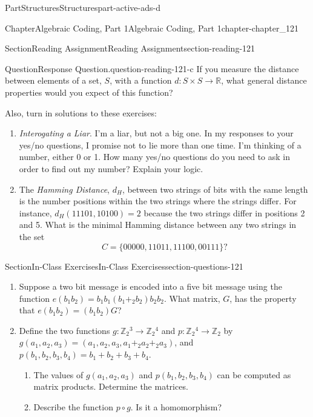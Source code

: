 \documentclass[oneside,10pt,]{book}
\numberwithin{equation}{section}
\begin{document}
\begin{partptx}{Part}{Structures}{}{Structures}{}{}{part-active-ads-d}
\begin{chapterptx}{Chapter}{Algebraic Coding, Part 1}{}{Algebraic Coding, Part 1}{}{}{chapter-chapter_121}
\begin{sectionptx}{Section}{Reading Assignment}{}{Reading Assignment}{}{}{section-reading-121}
\begin{question}{Question}{Response Question.}{question-reading-121-c}
If you measure the distance between elements of a set, \(S\), with a function \(d: S\times S \rightarrow \mathbb{R}\), what general distance properties would you expect of this function?%
\end{question}
Also, turn in solutions to these exercises:%
\begin{enumerate}[label=\arabic*.]
\item{}\emph{Interogating a Liar}.  I'm a liar, but not a big one.  In my responses to your yes\slash{}no questions, I promise not to lie more than one time.  I'm thinking of a number, either 0 or 1.  How many yes\slash{}no questions do you need to ask in order to find out my number? Explain your logic.%
\item{}The \emph{Hamming Distance}, \(d_H\), between two strings of bits with the same length is the number positions within the two strings where the strings differ.  For instance, \(d_H(11101,10100)=2\) because the two strings differ in positions 2 and 5.  What is the minimal Hamming distance between any two strings in the set%
\begin{equation*}
C =\{00000,11011,11100,00111\}?
\end{equation*}
%
\end{enumerate}
%
\end{sectionptx}
%
%
\typeout{************************************************}
\typeout{************************************************}
%
\begin{sectionptx}{Section}{In-Class Exercises}{}{In-Class Exercises}{}{}{section-questions-121}
%
\begin{enumerate}[label=\arabic*.]
\item{}Suppose a two bit message is encoded into a five bit message using the function \(e(b_{1}b_{2})=b_{1}b_{1}(b_{1}+_2 b_{2})b_{2}b_{2}\).  What matrix, \(G\), has the property that \(e(b_{1}b_{2})=(b_{1} b_{2}) G\)?%
\item{}Define the two functions  \(g:\mathbb{Z}_2{}^3\rightarrow  \mathbb{Z}_2{}^4\)  and \(p:\mathbb{Z}_2{}^4\to \mathbb{Z}_2\) by \(g(a_1,a_2,a_3) = (a_1,a_2,a_3 ,a_1+_2 a_2+_2a_3)\), and \(p(b_1,b_2,b_3,b_4)=b_1+b_2+b_3+b_4\).%
\begin{enumerate}[label=(\alph*)]
\item{}The values of \(g(a_1,a_2,a_3)\) and \(p(b_1,b_2,b_3,b_4)\) can be computed as matrix products.  Determine the matrices.%
\item{}Describe the function \(p \circ g\). Is it a homomorphism?%

\end{enumerate}
\end{enumerate}
\end{sectionptx}
\end{chapterptx}
\end{partptx}
\end{document}

